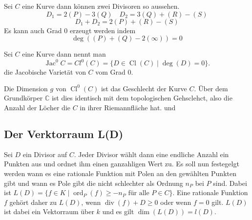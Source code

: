Sei $C$ eine Kurve dann können zwei Divisoren so aussehen.
\[
  D_1=2(P)-3(Q) \quad D_2 = 3(Q)+(R)-(S)
\]
\[
  D_1+D_2=2(P)+(R)-(S)
\]
Es kann auch Grad 0 erzeugt werden indem
\[
  \deg((P)+(Q)-2(\infty))=0
\]


\begin{definition}
  Sei $C$ eine Kurve dann nennt man
  \[
    \operatorname{Jac}^0 C= Cl^0(C)=\{D\in \operatorname{Cl}(C)\mid \deg(D) = 0\}.
  \]
  die Jacobische Varietät von $C$ vom Grad $0$.
\end{definition}
Die Dimension $g$ von $\operatorname{Cl}^0(C)$ ist das Geschlecht der Kurve $C$. Über dem Grundkörper $\mathbb{C}$ ist dies identisch mit dem topologischen Gehsclehct, also die Anzahl der Löcher die $C$ in ihrer Riemannfläche hat.
\cite[S.78]{Cohen06} und \cite[S.149]{Hulek12}






\subsection{Der Verktorraum L(D)}

Sei $D$ ein Divisor auf $C$. Jeder Divisor wählt dann eine endliche Anzahl ein Punkten aus und ordnet ihm einen ganzahligen Wert zu. Es soll nun festegelgt werden wann es eine rationale Funktion mit Polen an den gewählten Punkten gibt und wann es Pole gibt die nicht schlechter als Ordnung $n_P$ bei $P$ sind.
Dabei ist $L(D)=\{f\in K\mid \operatorname{ord}_P(f)\geq -n_P \text{ für alle }P\in C\}$. Eine rationale Funktion $f$ gehört daher zu $L(D)$, wenn $\operatorname{div}(f)+D\geq 0$ oder wenn $f=0$ gilt. $L(D)$ ist dabei ein Vektorraum über $k$ und es gilt \(\dim(L(D))=l(D)\).


